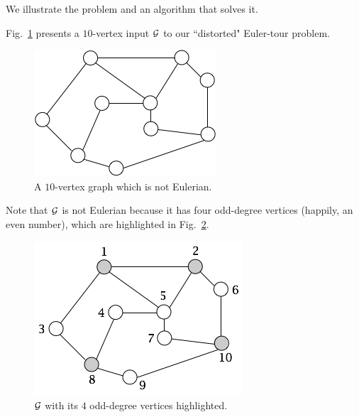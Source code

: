 \medskip

We illustrate the problem and an algorithm that solves it.

\smallskip

Fig.~\ref{fig:EulerianInitial} presents a $10$-vertex input $\mbox{$\cal G$}$ to our ``distorted" Euler-tour problem. 
\begin{figure}[hbt]
\begin{center}
       \includegraphics[scale=0.4]{FiguresGraph/EulerienInitial}
       \caption{A $10$-vertex graph which is not Eulerian.}
              \label{fig:EulerianInitial}
\end{center}
\end{figure}
Note that $\mbox{$\cal G$}$ is not Eulerian because it has four odd-degree vertices (happily, an even number), which are highlighted in Fig.~\ref{fig:EulerianVodd}.
\begin{figure}[hbt]
\begin{center}
       \includegraphics[scale=0.4]{FiguresGraph/EulerianVodd}
       \caption{$\mbox{$\cal G$}$ with its $4$ odd-degree vertices highlighted.}
              \label{fig:EulerianVodd}
\end{center}
\end{figure}


\medskip

